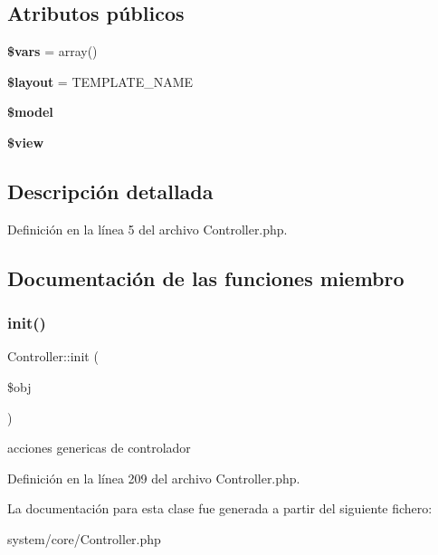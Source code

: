 \subsection*{Atributos públicos}
\begin{DoxyCompactItemize}
\item 
\mbox{\label{class_controller_a51a84d4b2aad22b65fca3976550fa31e}} 
{\bfseries \$vars} = array()
\item 
\mbox{\label{class_controller_aea20fa396e0fa1b8a500e7b8276e4d9a}} 
{\bfseries \$layout} = T\+E\+M\+P\+L\+A\+T\+E\+\_\+\+N\+A\+ME
\item 
\mbox{\label{class_controller_a4078f8d070afa3d19a462422fa1a3547}} 
{\bfseries \$model}
\item 
\mbox{\label{class_controller_aeb713d8b3c9bf61c72c4fcabd0e1e48a}} 
{\bfseries \$view}
\end{DoxyCompactItemize}


\subsection{Descripción detallada}


Definición en la línea 5 del archivo Controller.\+php.



\subsection{Documentación de las funciones miembro}
\mbox{\label{class_controller_a628beb30f4b8e9158a41e228671cf5aa}} 
\subsubsection{\texorpdfstring{init()}{init()}}
{\footnotesize\ttfamily Controller\+::init (\begin{DoxyParamCaption}\item[{}]{\$obj }\end{DoxyParamCaption})}

acciones genericas de controlador 

Definición en la línea 209 del archivo Controller.\+php.



La documentación para esta clase fue generada a partir del siguiente fichero\+:\begin{DoxyCompactItemize}
\item 
system/core/Controller.\+php\end{DoxyCompactItemize}
